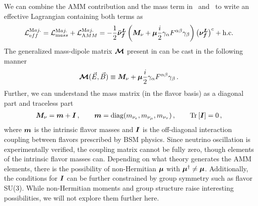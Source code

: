We can combine the AMM contribution and the mass term in~ and~ to write an effective Lagrangian containing both terms as
\begin{align}
	\label{massmom:1}
    \mathcal{L}_{\mathrm eff}^{\mathrm Maj.}=\mathcal{L}_{\mathrm mass}^{\mathrm Maj.} + \mathcal{L}_{\mathrm AMM}^{\mathrm Maj.}=-\frac{1}{2}\boldsymbol{\bar{\nu}_{f}^{L}}\left(\boldsymbol{M}_{\nu}+\boldsymbol{\mu}\frac{i}{2}\gamma_{\alpha}F^{\alpha\beta}\gamma_{\beta}\right)\left(\boldsymbol{\nu_{f}^{L}}\right)^{c}+\mathrm{h.c.}
\end{align}
The generalized mass-dipole matrix $\boldsymbol{\mathcal M}$ present in  can be cast in the following manner
\begin{align}
	\label{massmom:2}
    {\boldsymbol{\mathcal{M}}}(\vec{E},\vec{B})\equiv\boldsymbol{M}_{\nu}+\boldsymbol{\mu}\frac{i}{2}\gamma_{\alpha}F^{\alpha\beta}\gamma_{\beta}\,.
\end{align}
Further, we can understand the mass matrix (in the flavor basis) as a diagonal part and traceless part
\begin{align}
	\label{massmom:3}
    \boldsymbol{M}_{\nu}=\boldsymbol{m}+\boldsymbol{I}\,,\qquad
    \boldsymbol{m}=\mathrm{diag}(m_{\nu_{e}},m_{\nu_{\mu}},m_{\nu_{\tau}})\,,\qquad
    \mathrm{Tr}\left[\boldsymbol{I}\right] = 0 \,,
\end{align}
where $\boldsymbol{m}$ is the intrinsic flavor masses and $\boldsymbol{I}$ is the off-diagonal interaction coupling between flavors prescribed by BSM physics. Since neutrino oscillation is experimentally verified, the coupling matrix cannot be fully zero, though elements of the intrinsic flavor masses can. Depending on what theory generates the AMM elements, there is the possibility of non-Hermitian $\boldsymbol{\mu}$ with $\boldsymbol{\mu}^{\dagger}\neq\boldsymbol{\mu}$. Additionally, the conditions for $\boldsymbol{I}$ can be further constrained by group symmetry such as flavor SU(3). While non-Hermitian moments and group structure raise interesting possibilities, we will not explore them further here. 

